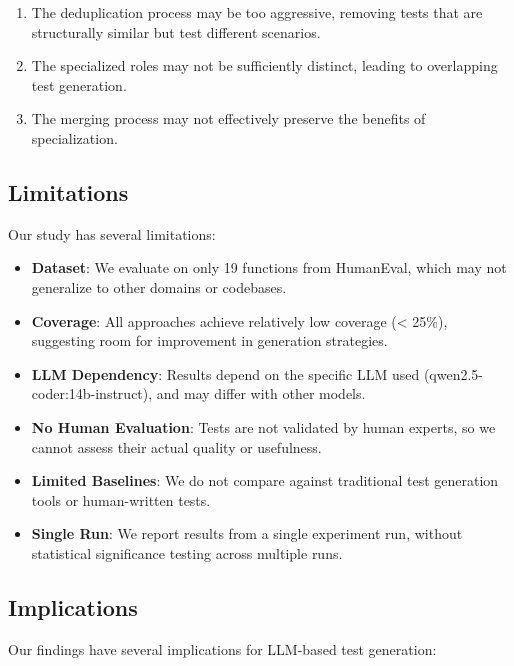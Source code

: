 \documentclass[11pt]{article}
\begin{document}
\begin{enumerate}
\item The deduplication process may be too aggressive, removing tests that are structurally similar but test different scenarios.
\item The specialized roles may not be sufficiently distinct, leading to overlapping test generation.
\item The merging process may not effectively preserve the benefits of specialization.
\end{enumerate}

\subsection{Limitations}

Our study has several limitations:

\begin{itemize}
\item \textbf{Dataset}: We evaluate on only 19 functions from HumanEval, which may not generalize to other domains or codebases.
\item \textbf{Coverage}: All approaches achieve relatively low coverage (< 25\%), suggesting room for improvement in generation strategies.
\item \textbf{LLM Dependency}: Results depend on the specific LLM used (qwen2.5-coder:14b-instruct), and may differ with other models.
\item \textbf{No Human Evaluation}: Tests are not validated by human experts, so we cannot assess their actual quality or usefulness.
\item \textbf{Limited Baselines}: We do not compare against traditional test generation tools or human-written tests.
\item \textbf{Single Run}: We report results from a single experiment run, without statistical significance testing across multiple runs.
\end{itemize}

\subsection{Implications}

Our findings have several implications for LLM-based test generation:
\end{document}
